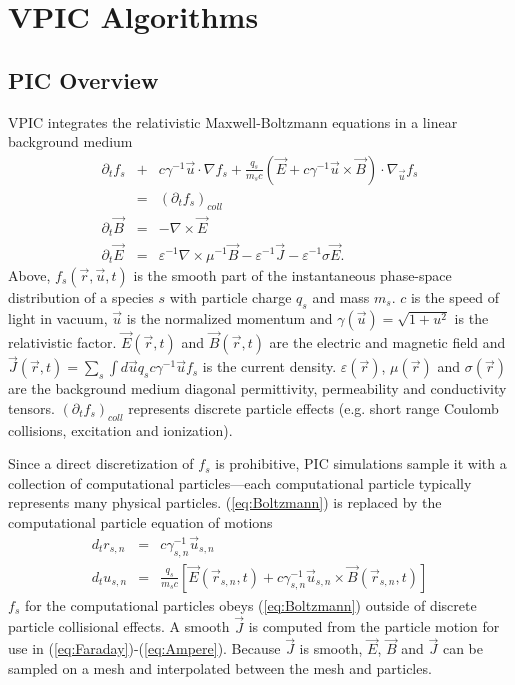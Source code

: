 \documentclass[aps,prl,preprint,preprintnumbers,groupedaddress]{revtex4}
\newcommand{\eps}{\varepsilon}
\newcommand{\vecr}{\vec{r}}
\newcommand{\vecu}{\vec{u}}
\newcommand{\vecJ}{\vec{J}}
\newcommand{\vecE}{\vec{E}}
\newcommand{\vecB}{\vec{B}}
\newcommand{\Deriv}[2]{d_{#2}#1}
\newcommand{\PDeriv}[2]{\partial_{#2}#1}
\newcommand{\DotP}[2]{#1 \cdot #2}
\newcommand{\CrossP}[2]{#1 \times #2}
\newcommand{\Grad}[1]{\nabla #1}
\newcommand{\Curl}[1]{\nabla \times #1}
\newcommand{\Gradu}[1]{\nabla_{\vecu} #1}
\newcommand{\eq}[1]{(\ref{eq:#1})}
\begin{document}
\section{VPIC Algorithms}

\subsection{PIC Overview}

VPIC integrates the relativistic Maxwell-Boltzmann equations in a
linear background medium
\begin{eqnarray}
\PDeriv{f_s}{t} &+& 
\DotP{c\gamma^{-1}\vecu}{\Grad{f_s}} +
\DotP{\frac{q_s}{m_s c} \left( \vecE + \CrossP{c\gamma^{-1}\vecu}{\vecB} \right)}{\Gradu{f_s}} \nonumber\\
&=& \left(\PDeriv{f_s}{t}\right)_{coll}
\label{eq:Boltzmann}\\
\PDeriv{\vecB}{t} &=& -\Curl{\vecE}
\label{eq:Faraday}\\
\PDeriv{\vecE}{t} &=&
\eps^{-1}\Curl{\mu^{-1}\vecB} - \eps^{-1}\vecJ - \eps^{-1}\sigma\vecE
\label{eq:Ampere}
.
\end{eqnarray}
Above, $f_s\left(\vecr,\vecu,t\right)$ is the smooth part of the
instantaneous phase-space distribution of a species $s$ with particle
charge $q_s$ and mass $m_s$.  $c$ is the speed of light in vacuum,
$\vecu$ is the normalized momentum and $\gamma\left(\vecu\right) =
\sqrt{1 + u^2}$ is the relativistic factor.
$\vecE\left(\vecr,t\right)$ and $\vecB\left(\vecr,t\right)$ are the
electric and magnetic field and $\vecJ\left(\vecr,t\right) =
\sum_s \int d\vecu q_s c\gamma^{-1}\vecu f_s$ is the current
density.  $\eps\left(\vecr\right)$, $\mu\left(\vecr\right)$ and
$\sigma\left(\vecr\right)$ are the background medium diagonal
permittivity, permeability and conductivity tensors.
$\left(\PDeriv{f_s}{t}\right)_{coll}$ represents discrete
particle effects (e.g. short range Coulomb collisions, excitation and
ionization).

Since a direct discretization of $f_s$ is prohibitive, PIC simulations
sample it with a collection of computational particles---each
computational particle typically represents many physical particles.
\eq{Boltzmann} is replaced by the computational particle
equation of motions
\begin{eqnarray}
\Deriv{r_{s,n}}{t} &=& c \gamma_{s,n}^{-1} \vecu_{s,n} \label{eq:Position}\\
\Deriv{u_{s,n}}{t} &=& \frac{q_s}{m_s c} \left[
\vecE\left(\vecr_{s,n},t\right) +
\CrossP{c\gamma_{s,n}^{-1}\vecu_{s,n}}{\vecB\left(\vecr_{s,n},t\right)}
\right] \label{eq:Momentum}
\end{eqnarray}
$f_s$ for the computational particles obeys \eq{Boltzmann} outside of
discrete particle collisional effects.  A smooth $\vecJ$ is computed
from the particle motion for use in \eq{Faraday}-\eq{Ampere}.  Because
$\vecJ$ is smooth, $\vecE$, $\vecB$ and $\vecJ$ can be sampled on a
mesh and interpolated between the mesh and particles.
\end{document}
